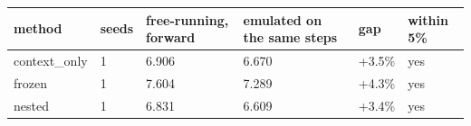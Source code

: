 \begin{tabular}{llllll}
\hline
method & seeds & free-running, forward & emulated on the same steps & gap & within 5\% \\
\hline
context\_only & 1 & 6.906 & 6.670 & +3.5\% & yes \\
frozen & 1 & 7.604 & 7.289 & +4.3\% & yes \\
nested & 1 & 6.831 & 6.609 & +3.4\% & yes \\
\hline
\end{tabular}
